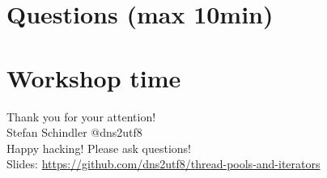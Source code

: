 \documentclass[aspectratio=1610,t]{beamer}
\begin{document}
{
\section{Questions (max 10min)}
}

{
\section{Workshop time}
}



%
%
%






{
\begin{frame}[standout]
	\begin{centering}
	{\Huge Thank you for your attention!}\\
	{\normalsize Stefan Schindler @dns2utf8 }\\
  {\normalsize Happy hacking! Please ask questions! }\\
	{\footnotesize Slides: \url{https://github.com/dns2utf8/thread-pools-and-iterators}}\\
	\end{centering}
\end{frame}
}
\end{document}
